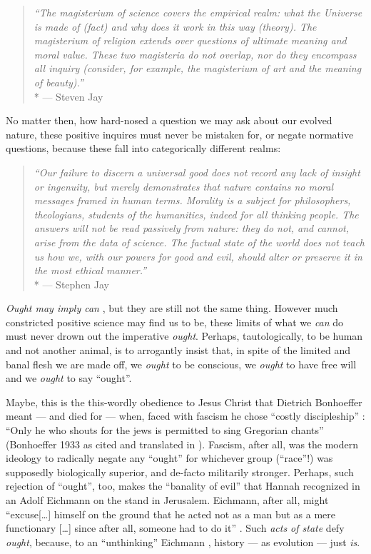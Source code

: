 \begin{quote}
	\emph{``The magisterium of science covers the empirical realm:
	what the Universe is made of (fact) and why does it work in this way (theory).
	The magisterium of religion extends over questions of ultimate meaning and moral value.
	These two magisteria do not overlap, nor do they encompass all inquiry (consider, for example, the magisterium of art and the meaning of beauty).''}
	\\*
	--- Steven Jay \citet[6]{Gould2002}
\end{quote}

No matter then, how hard-nosed a question we may ask about our evolved nature, these positive inquires must never be mistaken for, or negate normative questions, because these fall into categorically different realms:

\begin{quote}
	\emph{``Our failure to discern a universal good does not record any lack of insight or ingenuity, but merely demonstrates that nature contains no moral messages framed in human terms.
	Morality is a subject for philosophers, theologians, students of the humanities, indeed for all thinking people.
	The answers will not be read passively from nature:
	they do not, and cannot, arise from the data of science.
	The factual state of the world does not teach us how we, with our powers for good and evil, should alter or preserve it in the most ethical manner.''}
	\\*
	--- Stephen Jay \citet[43]{Gould1982}
\end{quote}

\emph{Ought may imply can} \citep[65]{Kant1794}, but they are still not the same thing.
However much constricted positive science may find us to be, these limits of what we \emph{can} do must never drown out the imperative \emph{ought}.
Perhaps, tautologically, to be human and not another animal, is to arrogantly insist that, in spite of the limited and banal flesh we are made off, we \emph{ought} to be conscious, we \emph{ought} to have free will and we \emph{ought} to say ``ought''.

Maybe, this is the this-wordly obedience to Jesus Christ that Dietrich Bonhoeffer meant --- and died for --- when, faced with fascism he chose ``costly discipleship'' \citep{Bonhoeffer1937}:
``Only he who shouts for the jews is permitted to sing Gregorian chants'' (Bonhoeffer 1933 as cited and translated in \citealt[35]{DeGruchy1999}).
Fascism, after all, was the modern ideology to radically negate any ``ought'' for whichever group (``race''!) was supposedly biologically superior, and de-facto militarily stronger.
Perhaps, such rejection of ``ought'', too, makes the ``banality of evil'' that Hannah \cite{Arendt1963} recognized in an Adolf Eichmann on the stand in Jerusalem.
Eichmann, after all, might ``excuse[\ldots] himself on the ground that he acted not as a man but as a mere functionary [\ldots] since after all, someone had to do it'' \citep[K286f.]{Arendt1963}.
Such \emph{acts of state} defy \emph{ought}, because, to an ``unthinking'' Eichmann \citep[K187f.]{Arendt1963}, history --- as evolution --- just \emph{is}.

